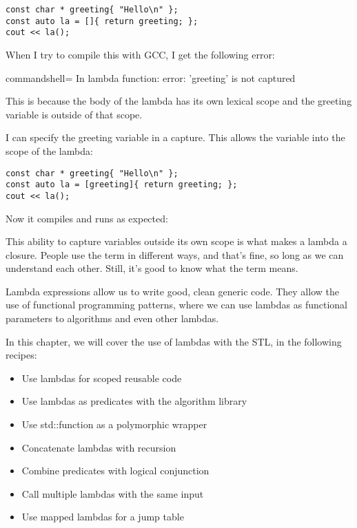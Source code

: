 \begin{lstlisting}[style=styleCXX]
const char * greeting{ "Hello\n" };
const auto la = []{ return greeting; };
cout << la();
\end{lstlisting}

When I try to compile this with GCC, I get the following error:

\begin{tcblisting}{commandshell={}}
In lambda function:
error: 'greeting' is not captured
\end{tcblisting}

This is because the body of the lambda has its own lexical scope and the greeting variable is outside of that scope.

I can specify the greeting variable in a capture. This allows the variable into the scope of the lambda:

\begin{lstlisting}[style=styleCXX]
const char * greeting{ "Hello\n" };
const auto la = [greeting]{ return greeting; };
cout << la();
\end{lstlisting}

Now it compiles and runs as expected:


This ability to capture variables outside its own scope is what makes a lambda a closure.
People use the term in different ways, and that's fine, so long as we can understand each other. Still, it's good to know what the term means.

Lambda expressions allow us to write good, clean generic code. They allow the use of functional programming patterns, where we can use lambdas as functional parameters to algorithms and even other lambdas.

In this chapter, we will cover the use of lambdas with the STL, in the following recipes:

\begin{itemize}
\item 
Use lambdas for scoped reusable code

\item 
Use lambdas as predicates with the algorithm library

\item 
Use std::function as a polymorphic wrapper

\item 
Concatenate lambdas with recursion

\item 
Combine predicates with logical conjunction

\item 
Call multiple lambdas with the same input

\item 
Use mapped lambdas for a jump table
\end{itemize}





